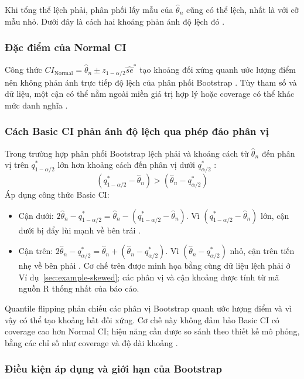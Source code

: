 Khi tổng thể lệch phải, phân phối lấy mẫu của $\hat{\theta}_n$ cũng có thể lệch, nhất là với cỡ mẫu nhỏ. Dưới đây là cách hai khoảng phản ánh độ lệch đó \cite{davison1997}.
	
	\subsubsection{Đặc điểm của Normal CI}
Công thức $CI_{\text{Normal}} = \hat{\theta}_n \pm z_{1-\alpha/2}\widehat{se}^*$ tạo khoảng đối xứng quanh ước lượng điểm nên không phản ánh trực tiếp độ lệch của phân phối Bootstrap \cite{efron1993}. Tùy tham số và dữ liệu, một cận có thể nằm ngoài miền giá trị hợp lý hoặc coverage có thể khác mức danh nghĩa \cite{davison1997}.

\subsubsection{Cách Basic CI phản ánh độ lệch qua phép đảo phân vị}
	Trong trường hợp phân phối Bootstrap lệch phải và khoảng cách từ $\hat{\theta}_n$ đến phân vị trên $q_{1-\alpha/2}^*$ lớn hơn khoảng cách đến phân vị dưới $q_{\alpha/2}^*$ \cite{davison1997}:
	\begin{equation}
		(q_{1-\alpha/2}^* - \hat{\theta}_n) > (\hat{\theta}_n - q_{\alpha/2}^*)
	\end{equation}
	Áp dụng công thức Basic CI:
	\begin{itemize}
		\item Cận dưới: $2\hat{\theta}_n - q_{1-\alpha/2}^* = \hat{\theta}_n - (q_{1-\alpha/2}^* - \hat{\theta}_n)$. Vì $(q_{1-\alpha/2}^* - \hat{\theta}_n)$ lớn, cận dưới bị đẩy lùi mạnh về bên trái \cite{davison1997}.
		\item Cận trên: $2\hat{\theta}_n - q_{\alpha/2}^* = \hat{\theta}_n + (\hat{\theta}_n - q_{\alpha/2}^*)$. Vì $(\hat{\theta}_n - q_{\alpha/2}^*)$ nhỏ, cận trên tiến nhẹ về bên phải \cite{davison1997}.
			Cơ chế trên được minh họa bằng cùng dữ liệu lệch phải ở Ví dụ~\ref{sec:example-skewed}; các phân vị và cận khoảng được tính từ mã nguồn R thống nhất của báo cáo.
	\end{itemize}
	Quantile flipping phản chiếu các phân vị Bootstrap quanh ước lượng điểm và vì vậy có thể tạo khoảng bất đối xứng. Cơ chế này không đảm bảo Basic CI có coverage cao hơn Normal CI; hiệu năng cần được so sánh theo thiết kế mô phỏng, bằng các chỉ số như coverage và độ dài khoảng \cite{efron1993, davison1997}.

\subsubsection{Điều kiện áp dụng và giới hạn của Bootstrap}


